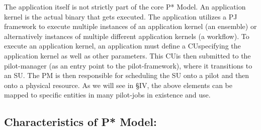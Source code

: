 \documentclass[conference,final]{IEEEtran}
\newcommand{\jhanote}[1]{ {\textcolor{red} { ***shantenu: #1 }}}
\newcommand{\jhanote}[1]{}
\newcommand{\cu}{CU}
\newcommand{\upp}{\vspace*{-0.5em}}
\begin{document}
The application itself is not strictly part of the core P* Model. %
An application kernel is the actual binary that gets executed.  The
application utilizes a PJ framework to execute multiple instances of
an application kernel (an ensemble) or alternatively instances of
multiple different application kernels (a workflow).  To execute an
application kernel, an application must define a \cu specifying the
application kernel as well as other parameters. This \cu is then
submitted to the pilot-manager (as an entry point to the
pilot-framework), where it transitions to an SU. The PM is then
responsible for scheduling the SU onto a pilot and then onto a
physical resource.  As we will see in \S{IV}, the above elements can
be mapped to specific entities in many pilot-jobs in existence and
use.

% 
% 


\subsection{Characteristics of P* Model:\upp\upp}
\label{sec:p_star_elements}


 
\end{document}
